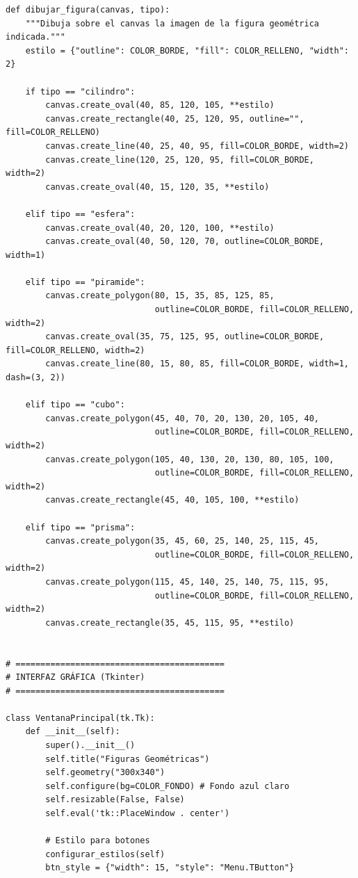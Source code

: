 \documentclass[11pt, a4paper]{article}
\begin{document}
\begin{lstlisting}
def dibujar_figura(canvas, tipo):
    """Dibuja sobre el canvas la imagen de la figura geométrica indicada."""
    estilo = {"outline": COLOR_BORDE, "fill": COLOR_RELLENO, "width": 2}

    if tipo == "cilindro":
        canvas.create_oval(40, 85, 120, 105, **estilo)
        canvas.create_rectangle(40, 25, 120, 95, outline="", fill=COLOR_RELLENO)
        canvas.create_line(40, 25, 40, 95, fill=COLOR_BORDE, width=2)
        canvas.create_line(120, 25, 120, 95, fill=COLOR_BORDE, width=2)
        canvas.create_oval(40, 15, 120, 35, **estilo)

    elif tipo == "esfera":
        canvas.create_oval(40, 20, 120, 100, **estilo)
        canvas.create_oval(40, 50, 120, 70, outline=COLOR_BORDE, width=1)

    elif tipo == "piramide":
        canvas.create_polygon(80, 15, 35, 85, 125, 85,
                              outline=COLOR_BORDE, fill=COLOR_RELLENO, width=2)
        canvas.create_oval(35, 75, 125, 95, outline=COLOR_BORDE, fill=COLOR_RELLENO, width=2)
        canvas.create_line(80, 15, 80, 85, fill=COLOR_BORDE, width=1, dash=(3, 2))

    elif tipo == "cubo":
        canvas.create_polygon(45, 40, 70, 20, 130, 20, 105, 40,
                              outline=COLOR_BORDE, fill=COLOR_RELLENO, width=2)
        canvas.create_polygon(105, 40, 130, 20, 130, 80, 105, 100,
                              outline=COLOR_BORDE, fill=COLOR_RELLENO, width=2)
        canvas.create_rectangle(45, 40, 105, 100, **estilo)

    elif tipo == "prisma":
        canvas.create_polygon(35, 45, 60, 25, 140, 25, 115, 45,
                              outline=COLOR_BORDE, fill=COLOR_RELLENO, width=2)
        canvas.create_polygon(115, 45, 140, 25, 140, 75, 115, 95,
                              outline=COLOR_BORDE, fill=COLOR_RELLENO, width=2)
        canvas.create_rectangle(35, 45, 115, 95, **estilo)


# ==========================================
# INTERFAZ GRÁFICA (Tkinter)
# ==========================================

class VentanaPrincipal(tk.Tk):
    def __init__(self):
        super().__init__()
        self.title("Figuras Geométricas")
        self.geometry("300x340")
        self.configure(bg=COLOR_FONDO) # Fondo azul claro
        self.resizable(False, False)
        self.eval('tk::PlaceWindow . center')

        # Estilo para botones
        configurar_estilos(self)
        btn_style = {"width": 15, "style": "Menu.TButton"}


\end{lstlisting}
\end{document}

